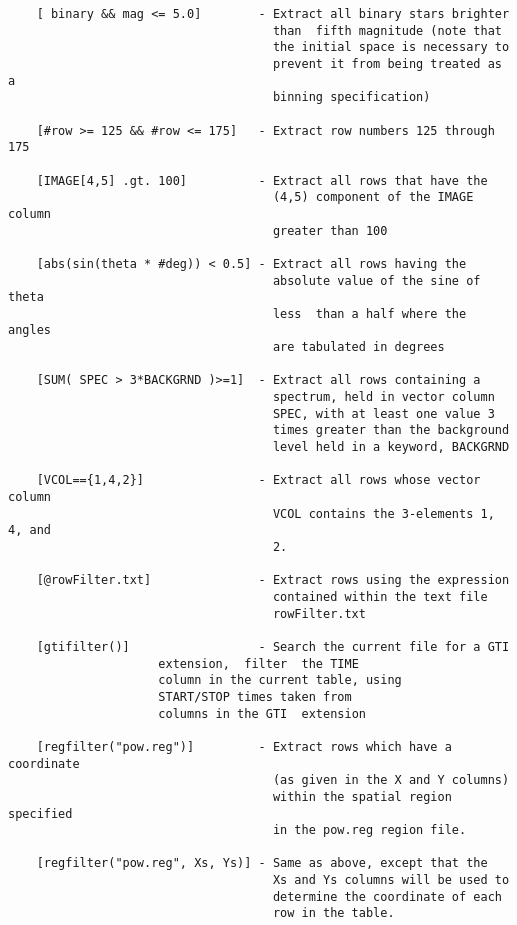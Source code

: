 \documentclass[11pt]{book}
\begin{document}
\begin{verbatim}
    [ binary && mag <= 5.0]        - Extract all binary stars brighter
                                     than  fifth magnitude (note that
                                     the initial space is necessary to
                                     prevent it from being treated as a
                                     binning specification)

    [#row >= 125 && #row <= 175]   - Extract row numbers 125 through 175

    [IMAGE[4,5] .gt. 100]          - Extract all rows that have the
                                     (4,5) component of the IMAGE column
                                     greater than 100

    [abs(sin(theta * #deg)) < 0.5] - Extract all rows having the
                                     absolute value of the sine of theta
                                     less  than a half where the angles
                                     are tabulated in degrees

    [SUM( SPEC > 3*BACKGRND )>=1]  - Extract all rows containing a
                                     spectrum, held in vector column
                                     SPEC, with at least one value 3
                                     times greater than the background
                                     level held in a keyword, BACKGRND

    [VCOL=={1,4,2}]                - Extract all rows whose vector column
                                     VCOL contains the 3-elements 1, 4, and
                                     2.

    [@rowFilter.txt]               - Extract rows using the expression
                                     contained within the text file
                                     rowFilter.txt

    [gtifilter()]                  - Search the current file for a GTI
				     extension,  filter  the TIME
				     column in the current table, using
				     START/STOP times taken from
				     columns in the GTI  extension

    [regfilter("pow.reg")]         - Extract rows which have a coordinate
                                     (as given in the X and Y columns)
                                     within the spatial region specified
                                     in the pow.reg region file.

    [regfilter("pow.reg", Xs, Ys)] - Same as above, except that the
                                     Xs and Ys columns will be used to
                                     determine the coordinate of each
                                     row in the table.
\end{verbatim}
\end{document}
